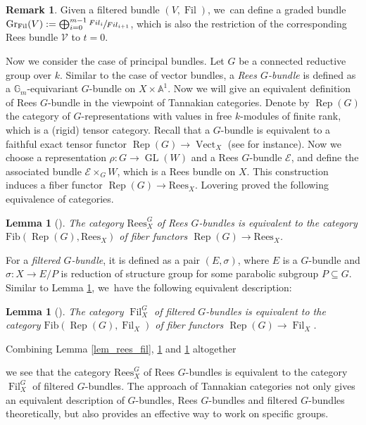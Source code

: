 \documentclass[11pt]{article}
\numberwithin{equation}{section}
\newcommand{\Fil}{\textit{Fil}}
\newcommand{\Fib}{\mathrm{Fib}}
\newcommand{\Rees}{\mathrm{Rees}}
\DeclareMathOperator{\Filt}{Fil}
\DeclareMathOperator{\GL}{GL}
\DeclareMathOperator{\Rep}{Rep}
\DeclareMathOperator{\Vect}{Vect}
\newcommand{\Gr}{\mathrm{Gr}}
\theoremstyle{plain}
\newtheorem{lem}[thm]{Lemma}
\theoremstyle{definition}
\newtheorem{rem}[thm]{Remark}
\begin{document}
\begin{rem}\label{rem_graded}
Given a filtered bundle $(V, \Filt)$, we~can define a graded bundle $\Gr_{\Filt}(V) := \bigoplus_{i=0}^{m-1} \sfrac{\Fil_i}{\Fil_{i+1}}$, which is also the restriction of the corresponding Rees bundle $\mathcal{V}$ to $t= 0$.
\end{rem}

Now we consider the case of principal bundles. Let $G$ be a connected reductive group over $k$. Similar to the case of vector bundles, a \emph{Rees $G$-bundle} is defined as a $\mathbb{G}_m$-equivariant $G$-bundle on $X \times \mathbb{A}^1$. Now we will give an equivalent definition of Rees $G$-bundle in the viewpoint of Tannakian categories. Denote by $\Rep(G)$ the category of $G$-representations with values in free $k$-modules of finite rank, which is a (rigid) tensor category. Recall that a $G$-bundle is equivalent to a faithful exact tensor functor $\Rep(G) \to \Vect_X$ (see \cite[\S 6]{Si92} for instance). Now we choose a representation $\rho : G \to \GL(W)$ and a Rees $G$-bundle $\mathcal{E}$, and define the associated bundle $\mathcal{E} \times_G W$, which is a Rees bundle on $X$. This construction induces a fiber functor $\Rep(G) \to \Rees_X$. Lovering proved the following equivalence of categories.

\begin{lem}[{\cite[Prop.\,2.2.7]{Lo17b}}]\label{lem_rees_G}
The category $\Rees^G_X$ of Rees $G$-bundles is equivalent to the category $\Fib(\Rep(G), \Rees_X)$ of fiber functors $\Rep(G) \to \Rees_X$.
\end{lem}

For a \emph{filtered $G$-bundle}, it is defined as a pair $(E,\sigma)$, where $E$ is a $G$-bundle and $\sigma: X \to E/P$ is reduction of structure group for some parabolic subgroup $P \subseteq G$. Similar to Lemma \ref{lem_rees_G}, we~have the following equivalent description:

\begin{lem}[{\cite[\S3]{Lo17a}}]\label{lem_fil_G}
The category $\Filt_X^G$ of filtered $G$-bundles is equivalent to the category $\Fib(\Rep(G), \Filt_X)$ of fiber functors $\Rep(G) \to \Filt_X$.
\end{lem}

Combining Lemma \ref{lem_rees_fil}, \ref{lem_rees_G} and \ref{lem_fil_G} altogether
\begin{center}
\end{center}
we see that the category $\Rees^G_X$ of Rees $G$-bundles is equivalent to the category $\Filt^G_X$ of filtered $G$-bundles. The approach of Tannakian categories not only gives an equivalent description of $G$-bundles, Rees $G$-bundles and filtered $G$-bundles theoretically, but also provides an effective way to work on specific groups.
\end{document}
